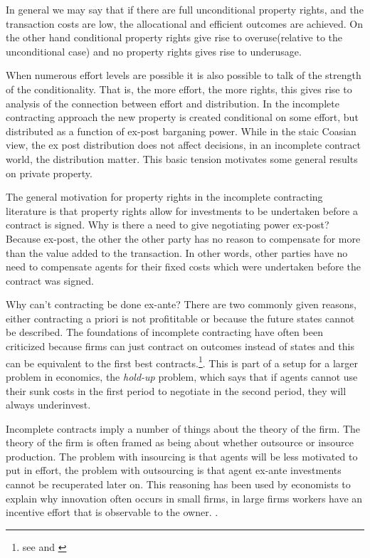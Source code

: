 \documentclass[12pt]{article}
\numberwithin{equation}{section}
\begin{document}
In general we may say that if there are full unconditional property rights, and the transaction costs are low, the allocational and efficient outcomes are achieved. On the other hand conditional property rights give rise to overuse(relative to the unconditional case) and no property rights gives rise to underusage. 

When numerous effort levels are possible it is also possible to talk of the strength of the conditionality. That is, the more effort, the more rights, this gives rise to analysis of the connection between effort and distribution. In the incomplete contracting approach the new property is created conditional on some effort, but distributed as a function of ex-post barganing power. While in the staic Coasian view, the ex post distribution does not affect decisions, in an incomplete contract world, the distribution matter. This basic tension motivates some general results on private property. 

The general motivation for property rights in the incomplete contracting literature is that property rights allow for investments to be undertaken before a contract is signed. Why is there a need to give negotiating power ex-post? Because ex-post, the other the other party has no reason to compensate for more than the value added to the transaction. In other words, other parties have no need to compensate agents for their fixed costs which were undertaken before the contract was signed. 

Why can't contracting be done ex-ante? There are two commonly given reasons, either contracting a priori is not profititable or because the future states cannot be described\cite{Hart1999}. The foundations of incomplete contracting have often been criticized because firms can just contract on outcomes instead of states and this can be equivalent to the first best contracts.\footnote{see \cite{Maskin2002} and \cite{maskin1999unforeseen}}. This is part of a setup for a larger problem in economics, the \textit{hold-up} problem, which says that if agents cannot use their sunk costs in the first period to negotiate in the second period, they will always underinvest. 

Incomplete contracts imply a number of things about the theory of the firm. The theory of the firm is often framed as being about whether outsource or insource production. The problem with insourcing is that agents will be less motivated to put in effort, the problem with outsourcing is that agent ex-ante investments cannot be recuperated later on. This reasoning has been used by economists to explain why innovation often occurs in small firms, in large firms workers have an incentive effort that is observable to the owner. \cite{Holmstrom1989}. 
\end{document}
